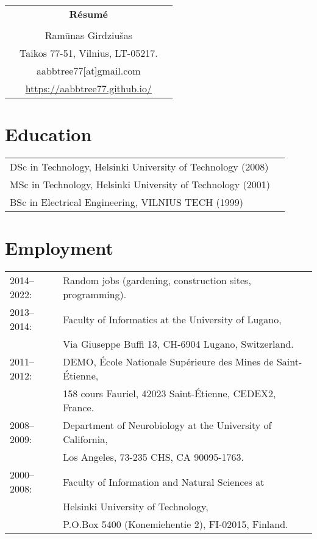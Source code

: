 \documentclass[a4paper,11pt]{article}
\begin{document}
\thispagestyle{empty}

%
%
\begin{center}
\begin{tabular}{ccc}
&\Large \textbf{R\'{e}sum\'{e}}&\\
\\
& Ram\={u}nas Girdziu\v{s}as &\\  
& Taikos 77-51, Vilnius, LT-05217. &\\
& aabbtree77[at]gmail.com &\\
& \url{https://aabbtree77.github.io/}
\end{tabular}
\end{center}
%
\section*{Education}
%
\begin{tabular}{ll}
        DSc in Technology, Helsinki University of Technology (2008)\\
        MSc in Technology, Helsinki University of Technology (2001)\\
        BSc in Electrical Engineering, VILNIUS TECH (1999)
\end{tabular}
%
\section*{Employment}
%
\begin{tabular}{ll}
2014--2022: & Random jobs (gardening, construction sites, programming). \\
2013--2014: & Faculty of Informatics at the University of Lugano,\\
                        & Via Giuseppe Buffi 13, CH-6904 Lugano, Switzerland. 
\\
2011--2012: & DEMO, \'{E}cole Nationale Sup\'{e}rieure des Mines de Saint-\'{E}tienne,\\
&158 cours Fauriel, 42023 Saint-\'Etienne, CEDEX2, France.
\\
2008--2009: & Department of Neurobiology at the University of California,\\
&Los Angeles, 73-235 CHS, CA 90095-1763.
\\
2000--2008: & Faculty of Information and Natural Sciences at\\
            & Helsinki University of Technology,\\ 
&  P.O.Box 5400 (Konemiehentie 2), FI-02015, Finland.
\end{tabular}
\end{document}
